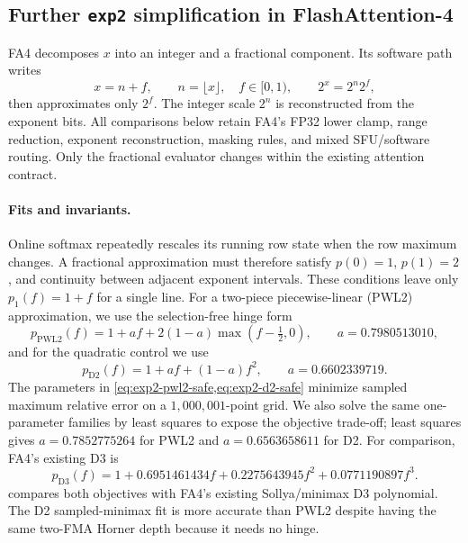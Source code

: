 \subsection{Further \texttt{exp2} simplification in FlashAttention-4}
\label{app:exp2-negative}

FA4 decomposes $x$ into an integer and a fractional component. Its software
path writes
\begin{equation}
    x=n+f,\qquad n=\lfloor x\rfloor,\quad f\in[0,1),\qquad
    2^x=2^n 2^f,
    \label{eq:exp2-reduction}
\end{equation}
then approximates only $2^f$. The integer scale $2^n$ is reconstructed from
the exponent bits. All comparisons below retain FA4's FP32 lower clamp, range
reduction, exponent reconstruction, masking rules, and mixed SFU/software
routing. Only the fractional evaluator changes within the existing attention
contract.

\paragraph{Fits and invariants.}
Online softmax repeatedly rescales its running row state when the row maximum
changes. A fractional approximation must therefore satisfy $p(0)=1$,
$p(1)=2$, and continuity between adjacent exponent intervals. These conditions
leave only $p_1(f)=1+f$ for a single line. For a two-piece piecewise-linear
(PWL2) approximation, we use the selection-free hinge form
\begin{equation}
    p_{\mathrm{PWL2}}(f)=1+af+2(1-a)\max(f-\tfrac12,0),
    \qquad a=0.7980513010,
    \label{eq:exp2-pwl2-safe}
\end{equation}
and for the quadratic control we use
\begin{equation}
    p_{\mathrm{D2}}(f)=1+af+(1-a)f^2,
    \qquad a=0.6602339719.
    \label{eq:exp2-d2-safe}
\end{equation}
The parameters in \cref{eq:exp2-pwl2-safe,eq:exp2-d2-safe} minimize sampled
maximum relative error on a $1{,}000{,}001$-point grid. We also solve the same
one-parameter families by least squares to expose the objective trade-off;
least squares gives $a=0.7852775264$ for PWL2 and $a=0.6563658611$ for D2.
For comparison, FA4's existing D3 is
\begin{equation}
    p_{\mathrm{D3}}(f)=1+0.6951461434f+0.2275643945f^2
    +0.0771190897f^3.
    \label{eq:exp2-d3-fa4}
\end{equation}
 compares both objectives with FA4's existing
Sollya/minimax D3 polynomial. The D2 sampled-minimax fit is more accurate than
PWL2 despite having the same two-FMA Horner depth because it needs no hinge.

